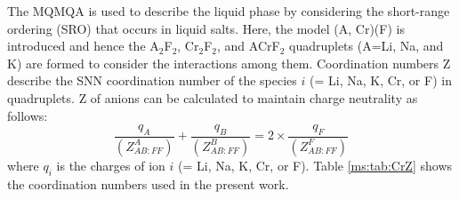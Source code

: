 The MQMQA \cite{pelton2001modified} is used to describe the liquid phase by considering the short-range ordering (SRO) that occurs in liquid salts. Here, the model (A, Cr)(F) is introduced and hence the A$_2$F$_2$, Cr$_2$F$_2$, and ACrF$_2$ quadruplets (A=Li, Na, and K) are formed to consider the interactions among them. Coordination numbers Z describe the SNN coordination number of the species $i$ (= Li, Na, K, Cr, or F) in quadruplets. Z of anions can be calculated to maintain charge neutrality as follows:
\begin{equation} \label{ms:eq:MQMZ}
    \dfrac{q_A}{(Z_{AB:FF}^A)}+\dfrac{q_B}{(Z_{AB:FF}^B)}=2\times \dfrac{q_F}{(Z_{AB:FF}^F)}
\end{equation}
where $q_i$ is the charges of ion $i$ (= Li, Na, K, Cr, or F). Table \ref{ms:tab:CrZ} shows the coordination numbers used in the present work.

